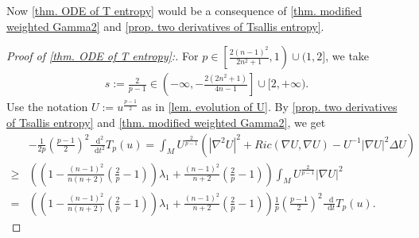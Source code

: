 \documentclass[11pt]{amsart}
\numberwithin{equation}{section}
\numberwithin{lemma}{section}
\numberwithin{proposition}{section}
\numberwithin{corollary}{section}
\numberwithin{remark}{section}
\newcommand{\dd}{\mathop{}\!\mathrm{d}}%
\begin{document}
Now \cref{thm. ODE of T entropy} would be a consequence of \cref{thm. modified weighted Gamma2} and 
\cref{prop. two derivatives of Tsallis entropy}.
\begin{proof}[Proof of \cref{thm. ODE of T entropy}:]
    For $p\in\left[\frac{2(n-1)^2}{2n^2+1},1\right)\cup(1,2]$, we take
    \begin{align*}
        s:=\frac{2}{p-1}\in\left(-\infty,-\frac{2(2n^2+1)}{4n-1}\right]\cup[2,+\infty).
    \end{align*}
    Use the notation $U:=u^{\frac{p-1}{2}}$ as in \cref{lem. evolution of U}. By \cref{prop. two derivatives of Tsallis entropy} and \cref{thm. modified weighted Gamma2}, we get
    \begin{align*}
        &-\frac{1}{2p}\left(\frac{p-1}{2}\right)^2
        \frac{\dd^2}{\dd t^2}T_p(u)
        =\int_M U^{\frac{2}{p-1}}(|\nabla^2 U|^2+Ric(\nabla U,\nabla U)-U^{-1}|\nabla U|^2\Delta U)\\
        \geq& 
        \left(\left(
        1-\frac{(n-1)^2}{n(n+2)}\left(\frac{2}{p}-1\right)
        \right)\lambda_1
        +\frac{(n-1)^2}{n+2}\left(\frac{2}{p}-1\right)
        \right)
        \int_M U^{\frac{2}{p-1}}|\nabla U|^2\\
        =&\left(\left(
        1-\frac{(n-1)^2}{n(n+2)}\left(\frac{2}{p}-1\right)
        \right)\lambda_1
        +\frac{(n-1)^2}{n+2}\left(\frac{2}{p}-1\right)
        \right)
        \frac{1}{p}
        \left(\frac{p-1}{2}\right)^2
        \frac{\dd}{\dd t}T_p(u).
    \end{align*}

\end{proof}
\end{document}
